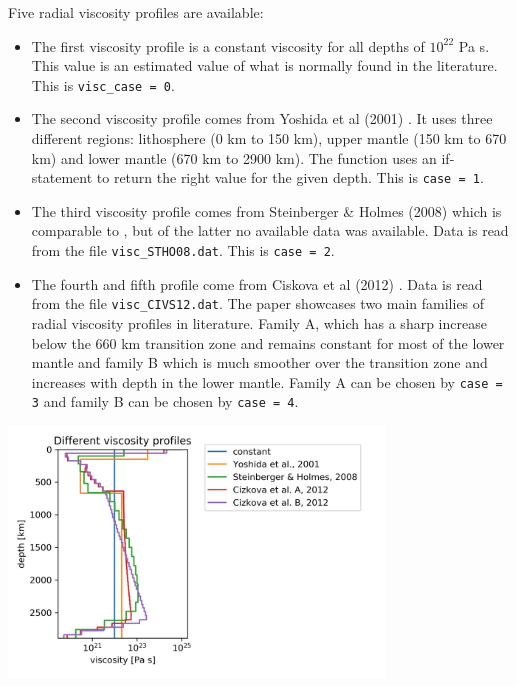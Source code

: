 Five radial viscosity profiles are available:
\begin{itemize}
\item The first viscosity profile is a constant viscosity for all depths of $10^{22}$ Pa s. 
This value is an estimated value of what is normally found in the literature. This is \texttt{visc\_case = 0}. 

\item The second viscosity profile comes from Yoshida et al (2001) \cite{yohk01}. It uses three different regions: lithosphere (0 km to 150 km), upper mantle (150 km to 670 km) and lower mantle (670 km to 2900 km). The function uses an if-statement to return the right value for the given depth. This is \texttt{case = 1}.

\item The third viscosity profile comes from Steinberger \& Holmes (2008) \cite{stho08} 
which is comparable to \cite{stca06}, but of the latter no available data was available. 
Data is read from the file \texttt{visc\_STHO08.dat}. 
This is \texttt{case = 2}.

\item The fourth and fifth profile come from Ciskova et al (2012) \cite{civs2012}. 
Data is read from the file \texttt{visc\_CIVS12.dat}. 
The paper showcases two main families of radial viscosity profiles in literature. Family A, which has a sharp 
increase below the 660 km transition zone and remains constant for most of the lower mantle 
and family B which is much smoother over the transition zone and increases with depth in the lower mantle. 
Family A can be chosen by \texttt{case = 3} and family B can be chosen by \texttt{case = 4}.

\end{itemize}

\begin{center}
\includegraphics[width=10cm]{python_codes/fieldstone_71/images/visc}
\end{center}


